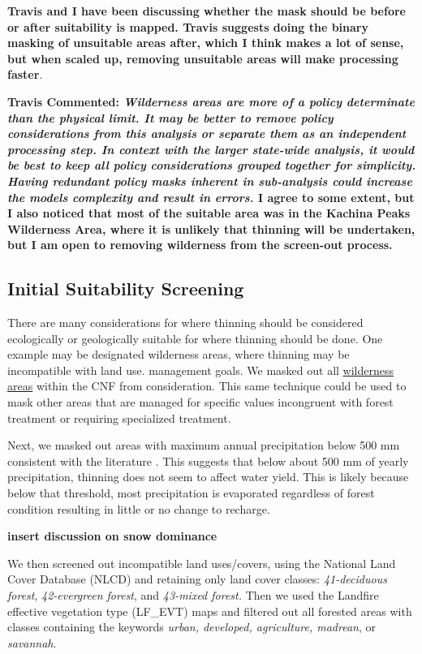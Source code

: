 \documentclass[
  number,
  preprint,
  3p,
  onecolumn]{elsarticle}
\begin{document}
\textbf{Travis and I have been discussing whether the mask should be
before or after suitability is mapped. Travis suggests doing the binary
masking of unsuitable areas after, which I think makes a lot of sense,
but when scaled up, removing unsuitable areas will make processing
faster}.

\textbf{Travis Commented: \emph{Wilderness areas are more of a policy
determinate than the physical limit. It may be better to remove policy
considerations from this analysis or separate them as an independent
processing step. In context with the larger state-wide analysis, it
would be best to keep all policy considerations grouped together for
simplicity. Having redundant policy masks inherent in sub-analysis could
increase the models complexity and result in errors.} I agree to some
extent, but I also noticed that most of the suitable area was in the
Kachina Peaks Wilderness Area, where it is unlikely that thinning will
be undertaken, but I am open to removing wilderness from the screen-out
process.}

\subsection{Initial Suitability
Screening}\label{initial-suitability-screening}

There are many considerations for where thinning should be considered
ecologically or geologically suitable for where thinning should be done.
One example may be designated wilderness areas, where thinning may be
incompatible with land use. management goals. We masked out all
\href{https://gis1.usgs.gov/arcgis/rest/services/padus3/Fee_Managers/MapServer}{wilderness
areas} within the CNF from consideration. This same technique could be
used to mask other areas that are managed for specific values
incongruent with forest treatment or requiring specialized treatment.

Next, we masked out areas with maximum annual precipitation below 500 mm
consistent with the literature
\citep{bosch1982, hibbert1979b, adams2012a, biederman2022a}. This
suggests that below about 500 mm of yearly precipitation, thinning does
not seem to affect water yield. This is likely because below that
threshold, most precipitation is evaporated regardless of forest
condition resulting in little or no change to recharge.

\textbf{insert discussion on snow dominance}

We then screened out incompatible land uses/covers, using the National
Land Cover Database (NLCD) and retaining only land cover classes:
\emph{41-deciduous forest}, \emph{42-evergreen forest}, and
\emph{43-mixed forest.} Then we used the Landfire effective vegetation
type (LF\_EVT) maps and filtered out all forested areas with classes
containing the keywords \emph{urban, developed, agriculture, madrean},
or \emph{savannah}.
\end{document}
